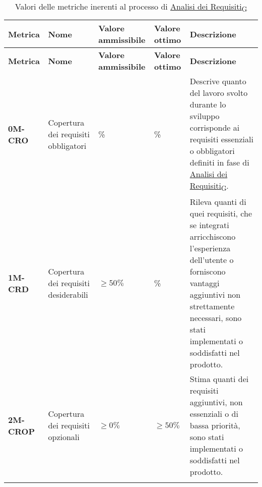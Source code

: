 \begin{longtable}{|>{\centering\arraybackslash}p{}|>{\centering\arraybackslash}p{}|>{\centering\arraybackslash}p{}|>{\centering\arraybackslash}p{}|>{\centering\arraybackslash}p{}|}
	\hline
	\textbf{Metrica} & \textbf{Nome}                        & \textbf{Valore ammissibile} & \textbf{Valore ottimo} & \textbf{Descrizione}                                                                                                                                                                                      \\
	\hline
	\endfirsthead
	\hline
	\textbf{Metrica} & \textbf{Nome}                        & \textbf{Valore ammissibile} & \textbf{Valore ottimo} & \textbf{Descrizione}                                                                                                                                                                                      \\
	\endhead
	\textbf{0M-CRO}  & Copertura dei requisiti obbligatori  & 100\%                       & 100\%                  & Descrive quanto del lavoro svolto durante lo sviluppo corrisponde ai requisiti essenziali o obbligatori definiti in fase di \href{https://7last.github.io/docs/rtb/documentazione-interna/glossario#analisi-dei-requisiti}{Analisi dei Requisiti\textsubscript{G}}.                                                        \\
	\hline
	\textbf{1M-CRD}  & Copertura dei requisiti desiderabili & $\geq 50\% $                & 100\%                  & Rileva quanti di quei requisiti, che se integrati arricchiscono l'esperienza dell'utente o forniscono vantaggi aggiuntivi non strettamente necessari, sono stati implementati o soddisfatti nel prodotto. \\
	\hline
	\textbf{2M-CROP} & Copertura dei requisiti opzionali    & $\geq 0\% $                 & $\geq 50\% $           & Stima quanti dei requisiti aggiuntivi, non essenziali o di bassa priorità, sono stati implementati o soddisfatti nel prodotto.                                                                            \\
	\hline
	\caption{ Valori delle metriche inerenti al processo di \href{https://7last.github.io/docs/rtb/documentazione-interna/glossario#analisi-dei-requisiti}{Analisi dei Requisiti\textsubscript{G}}}
	\label{table:1}
\end{longtable}

